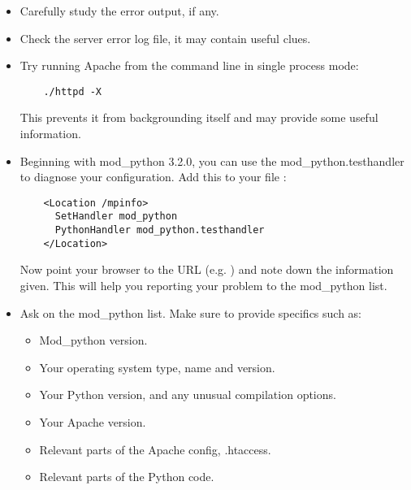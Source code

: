 \begin{itemize}

\item Carefully study the error output, if any. 

\item Check the server error log file, it may contain useful clues. 

\item Try running Apache from the command line in single process mode:
  \begin{verbatim}
    ./httpd -X
  \end{verbatim}
  This prevents it from backgrounding itself and may provide some useful
  information.

\item Beginning with mod_python 3.2.0, you can use the mod_python.testhandler
  to diagnose your configuration. Add this to your  file :

  \begin{verbatim}
    <Location /mpinfo>
      SetHandler mod_python
      PythonHandler mod_python.testhandler
    </Location>
  \end{verbatim}

  Now point your browser to the  URL
  (e.g. ) and note down the information given.
  This will help you reporting your problem to the mod_python list.

\item
  Ask on the mod_python list. Make sure to provide specifics such as:

  \begin{itemize}

  \item Mod_python version.
  \item Your operating system type, name and version.
  \item Your Python version, and any unusual compilation options.
  \item Your Apache version.
  \item Relevant parts of the Apache config, .htaccess.
  \item Relevant parts of the Python code.

  \end{itemize}

\end{itemize}

